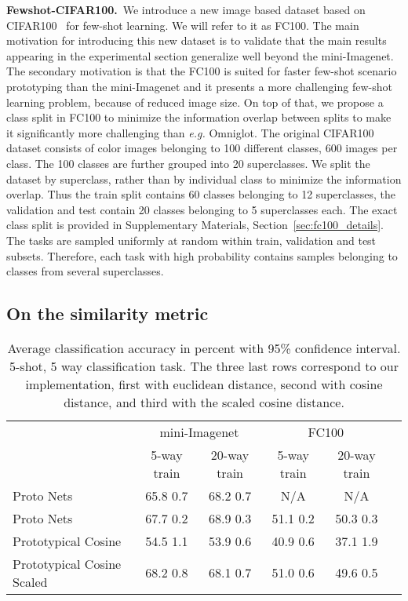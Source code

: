 \documentclass{article}
\begin{document}
\textbf{Fewshot-CIFAR100.}~We introduce a new image based dataset based on CIFAR100~\citep{Krizhevsky2009learning} for few-shot learning. We will refer to it as FC100. The main motivation for introducing this new dataset is to validate that the main results appearing in the experimental section generalize well beyond the mini-Imagenet. The secondary motivation is that the FC100 is suited for faster few-shot scenario prototyping than the mini-Imagenet and it presents a more challenging few-shot learning problem, because of reduced image size. On top of that, we propose a class split in FC100 to minimize the information overlap between splits to make it significantly more challenging than \emph{e.g.} Omniglot. The original CIFAR100 dataset consists of  color images belonging to 100 different classes, 600 images per class. The 100 classes are further grouped into 20 superclasses. We split the dataset by superclass, rather than by individual class to minimize the information overlap. Thus the train split contains 60 classes belonging to 12 superclasses, the validation and test contain 20 classes belonging to 5 superclasses each. The exact class split is provided in Supplementary Materials, Section~\ref{sec:fc100_details}. The tasks are sampled uniformly at random within train, validation and test subsets. Therefore, each task with high probability contains samples belonging to classes from several superclasses.

\subsection{On the similarity metric}\label{ssec:cosine_distance}


\begin{table}[t]
\centering
    \caption{Average classification accuracy in percent with 95\% confidence interval. 5-shot, 5 way classification task. The three last rows correspond to our implementation, first with euclidean distance, second with cosine distance, and third with the scaled cosine distance.}
    \label{table:cosine_vs_euclidian}
    \begin{tabular}{lccccr} 
        \toprule
         & \multicolumn{2}{c}{mini-Imagenet}  & \multicolumn{2}{c}{FC100} &  \\ 
         & 5-way train    &  20-way train   & 5-way train &  20-way train  \\ 
        \hline
        Proto Nets \cite{snell2017prototypical} & 65.8  0.7 & 68.2  0.7 & {N/A}  & {N/A} \\
        \hline
        Proto Nets & 67.7  0.2 & 68.9  0.3 & 51.1  0.2  & 50.3  0.3  \\
Prototypical Cosine & 54.5  1.1   & 53.9  0.6   & 40.9  0.6   & 37.1  1.9 \\ 
        Prototypical Cosine Scaled &  68.2  0.8  & 68.1  0.7  & 51.0  0.6  & 49.6  0.5 \\  
        \bottomrule
    \end{tabular}
\end{table}
\end{document}
